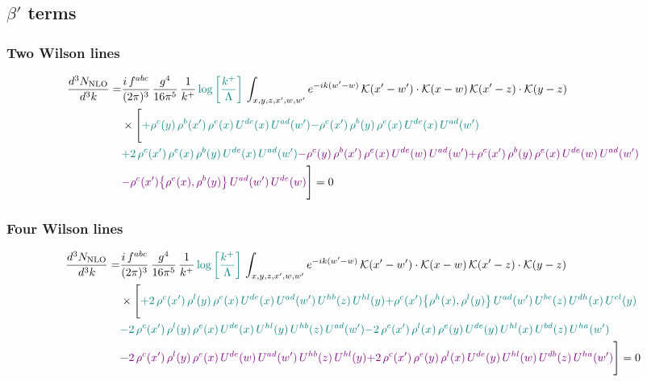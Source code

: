 \documentclass[9pt]{article}
\numberwithin{equation}{section}
\begin{document}
\subsection{$\beta'$ terms}
\subsubsection{Two Wilson lines}
\begin{align}
    \frac{d^{3}N_{\rm NLO}}{d^{3}k}= & \frac{i\,f^{abc}}{(2\pi)^{3}}\,\frac{g^{4}}{16\pi^{5}}\,\frac{1}{k^{+}}\,{\color{teal}\log{\left[\frac{k^{+}}{\Lambda}\right]}}\,\int_{x,y,z,x',w,w'}e^{-ik(w'-w)}\,\mathcal{K}(x'-w')\cdot\mathcal{K}(x-w)\,\mathcal{K}(x'-z)\cdot\mathcal{K}(y-z)\notag \\ & \times\Bigg[{\color{teal}+\rho^{c}(y)\,\rho^{b}(x')\,\rho^{e}(x)\,U^{de}(x)\,U^{ad}(w')}{\color{teal}-\rho^{c}(x')\,\rho^{b}(y)\,\rho^{e}(x)\,U^{de}(x)\,U^{ad}(w')}\notag \\ & {\color{teal}+2\,\rho^{c}(x')\,\rho^{e}(x)\,\rho^{b}(y)\,U^{de}(x)\,U^{ad}(w')}{\color{violet}-\rho^{c}(y)\,\rho^{b}(x')\,\rho^{e}(x)\,U^{de}(w)\,U^{ad}(w')}{\color{violet}+\rho^{c}(x')\,\rho^{b}(y)\,\rho^{e}(x)\,U^{de}(w)\,U^{ad}(w')}\notag \\ & {\color{violet} -\rho^{c}(x')\big\{\rho^{e}(x),\rho^{b}(y)\big\}\,U^{ad}(w')\,U^{de}(w)}\Bigg] = 0 
\end{align}    
\subsubsection{Four Wilson lines}
\begin{align}
    \frac{d^{3}N_{\rm NLO}}{d^{3}k}= & \frac{i\,f^{abc}}{(2\pi)^{3}}\,\frac{g^{4}}{16\pi^{5}}\,\frac{1}{k^{+}}\,{\color{teal}\log{\left[\frac{k^{+}}{\Lambda}\right]}}\,\int_{x,y,z,x',w,w'}e^{-ik(w'-w)}\,\mathcal{K}(x'-w')\cdot\mathcal{K}(x-w)\,\mathcal{K}(x'-z)\cdot\mathcal{K}(y-z)\notag \\ & \times\Bigg[{\color{teal}+2\,\rho^{c}(x')\,\rho^{l}(y)\,\rho^{e}(x)\,U^{de}(x)\,U^{ad}(w')\,U^{hb}(z)\,U^{hl}(y)}{\color{teal}+\rho^{c}(x')\big\{\rho^{h}(x),\rho^{l}(y)\big\}\,U^{ad}(w')\,U^{be}(z)\,U^{dh}(x)\,U^{el}(y)}\notag \\ & {\color{teal}-2\,\rho^{c}(x')\,\rho^{l}(y)\,\rho^{e}(x)\,U^{de}(x)\,U^{hl}(y)\,U^{hb}(z)\,U^{ad}(w')}{\color{teal}-2\,\rho^{c}(x')\,\rho^{l}(x)\,\rho^{e}(y)\,U^{de}(y)\,U^{hl}(x)\,U^{bd}(z)\,U^{ha}(w')}\notag \\ & {\color{violet}-2\,\rho^{c}(x')\,\rho^{l}(y)\,\rho^{e}(x)\,U^{de}(w)\,U^{ad}(w')\,U^{hb}(z)\,U^{hl}(y)}{\color{violet}+2\,\rho^{c}(x')\,\rho^{e}(y)\,\rho^{l}(x)\,U^{de}(y)\,U^{hl}(w)\,U^{db}(z)\,U^{ha}(w')}\Bigg] = 0
\end{align}
\end{document}
